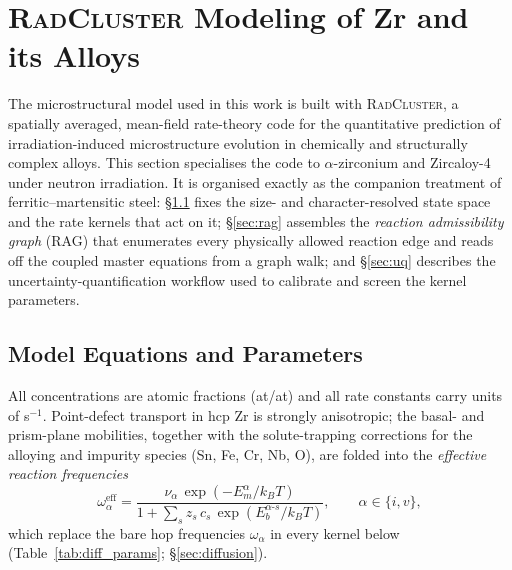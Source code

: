 \section{\textsc{RadCluster} Modeling of Zr and its Alloys}
\label{sec:equations}
The microstructural model used in this work is built with
\textsc{RadCluster}, a spatially averaged, mean-field rate-theory code
for the quantitative prediction of irradiation-induced microstructure
evolution in chemically and structurally complex alloys. This section
specialises the code to $\alpha$-zirconium and Zircaloy-4 under neutron
irradiation. It is organised exactly as the companion treatment of
ferritic--martensitic steel: \S\ref{sec:model_equations} fixes the
size- and character-resolved state space and the rate kernels that act
on it; \S\ref{sec:rag} assembles the \emph{reaction admissibility graph}
(\textsc{RAG}) that enumerates every physically allowed reaction edge
and reads off the coupled master equations from a graph walk; and
\S\ref{sec:uq} describes the uncertainty-quantification workflow used to
calibrate and screen the kernel parameters.

\subsection{Model Equations and Parameters}
\label{sec:model_equations}
All concentrations are atomic fractions (at/at) and all rate constants
carry units of s$^{-1}$. Point-defect transport in hcp Zr is strongly
anisotropic; the basal- and prism-plane mobilities, together with the
solute-trapping corrections for the alloying and impurity species
(Sn, Fe, Cr, Nb, O), are folded into the \emph{effective reaction
frequencies}
\begin{equation}\label{eq:omega_eff}
    \omega_\alpha^{\mathrm{eff}}
    = \frac{\nu_\alpha\,\exp(-E_m^\alpha/k_BT)}
           {1 + \sum_s z_s\,c_s\,\exp(E_b^{\alpha\text{-}s}/k_BT)},
    \qquad \alpha\in\{i,v\},
\end{equation}
which replace the bare hop frequencies $\omega_\alpha$ in every kernel
below (Table~\ref{tab:diff_params}; \S\ref{sec:diffusion}).

